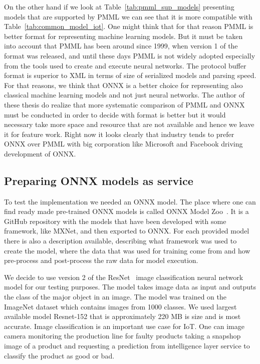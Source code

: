 \documentclass[english, 12pt, a4paper, elec, utf8, online]{aaltothesis}
\begin{document}
On the other hand if we look at Table~\ref{tab:pmml_sup_models} presenting models that are supported by PMML we can see that it is more compatible with Table~\ref{tab:common_model_iot}. One might think that for that reason PMML is better format for representing machine learning models. But it must be taken into account that PMML has been around since 1999, when version 1 of the format was released, and until these days PMML is not widely adopted especially from the tools used to create and execute neural networks. The protocol buffer format is superior to XML in terms of size of serialized models and parsing speed. For that reasons, we think that ONNX is a better choice for representing also classical machine learning models and not just neural networks. The author of these thesis do realize that more systematic comparison of PMML and ONNX must be conducted in order to decide with format is better but it would necessary take more space and resource that are not available and hence we leave it for feature work. Right now it looks clearly that industry tends to prefer ONNX over PMML with big corporation like Microsoft and Facebook driving development of ONNX.

\subsection{Preparing ONNX models as service}     
To test the implementation we needed an ONNX model. The place where one can find ready made pre-trained ONNX models is called ONNX Model Zoo~\cite{onnx_model_zoo}. It is a GitHub repository with the models that have been developed with some framework, like MXNet, and then exported to ONNX. For each provided model there is also a description available, describing what framework was used to create the model, where the data that was used for training come from and how pre-process and post-process the raw data for model execution.

We decide to use version 2 of the ResNet~\cite{he2016deep} image classification neural network model for our testing purposes. The model takes image data as input and outputs the class of the major object in an image. The model was trained on the ImageNet dataset which contains images from 1000 classes. We used largest available model Resnet-152 that is approximately 220 MB is size and is most accurate. Image classification is an important use case for IoT. One can image camera monitoring the production line for faulty products taking a snapshop image of a product and requesting a prediction from intelligence layer service to classify the product as good or bad.        
\end{document}
